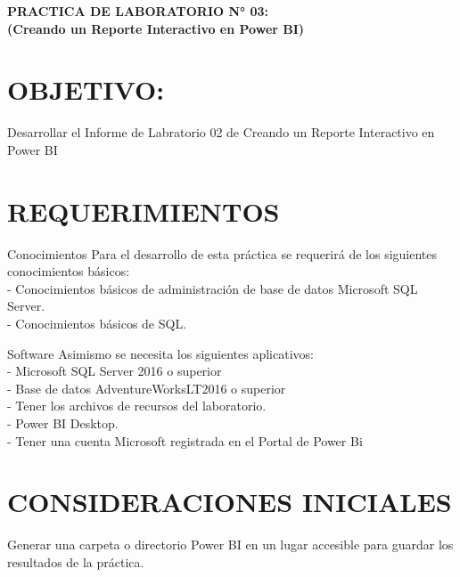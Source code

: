 \begin{center}
\vspace*{0.1in}
\begin{Large}
\textbf{PRACTICA DE LABORATORIO N° 03:} \\
\textbf{(Creando un Reporte Interactivo en Power BI)} \\
\end{Large}
\end{center}

\section{OBJETIVO:}
\item{
Desarrollar el Informe de Labratorio 02 de Creando un Reporte Interactivo en Power BI}
\section{REQUERIMIENTOS}
\begin{itemize}

Conocimientos
Para el desarrollo de esta práctica se requerirá de los siguientes conocimientos básicos:
\\- Conocimientos básicos de administración de base de datos Microsoft SQL Server.
\\- Conocimientos básicos de SQL.

Software
Asimismo se necesita los siguientes aplicativos:
\\- Microsoft SQL Server 2016 o superior
\\- Base de datos AdventureWorksLT2016 o superior
\\- Tener los archivos de recursos del laboratorio.
\\- Power BI Desktop.
\\- Tener una cuenta Microsoft registrada en el Portal de Power Bi

\end{itemize}

\section{CONSIDERACIONES INICIALES}
\item{Generar una carpeta o directorio Power BI en un lugar accesible para guardar los resultados de la práctica.}\\
\\\\\\\\\\\\\\\\\\\\\\\\\\\\
